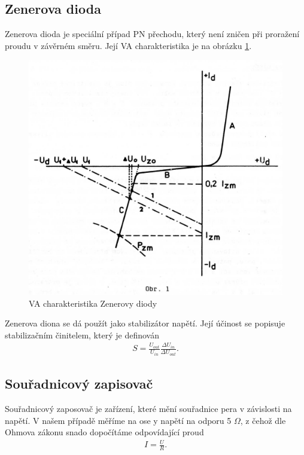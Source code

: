 \documentclass[a4paper,12pt]{article}
\begin{document}
\subsection{Zenerova dioda}
Zenerova dioda je speciální případ PN přechodu, který není zničen při proražení proudu v závěrném směru. Její VA charakteristika je na obrázku \ref{VAZ}.
\begin{figure}
\begin{center}
\includegraphics[scale=0.2]{VAZ.eps}
\caption{VA charakteristika Zenerovy diody}
\end{center}
\label{VAZ}
\end{figure}

Zenerova diona se dá použít jako stabilizátor napětí. Její účinost se popisuje stabilizačním činitelem, který je definován
\begin{eqnarray}
S=\frac{U_{out}}{U_{in}}\frac{\Delta U_{in}}{\Delta U_{out}}.
\end{eqnarray}

\subsection{Souřadnicový zapisovač}
Souřadnicový zaposovač je zařízení, které mění souřadnice pera v závislosti na napětí. V našem případě měříme na ose y napětí na odporu 5 $\Omega$, z čehož dle 
Ohmova zákonu snado dopočítáme odpovídající proud
\begin{eqnarray}
I=\frac{U}{R}.
\end{eqnarray}
\end{document}
